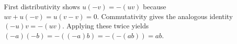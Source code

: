 First distributivity shows $u(-v)=-(uv)$ because $uv+u(-v)=u(v-v)=0$. Commutativity gives the analogous identity $(-u)v=-(uv)$. Applying these twice yields $(-a)(-b)=-((-a)b)=-(-(ab))=ab$.
